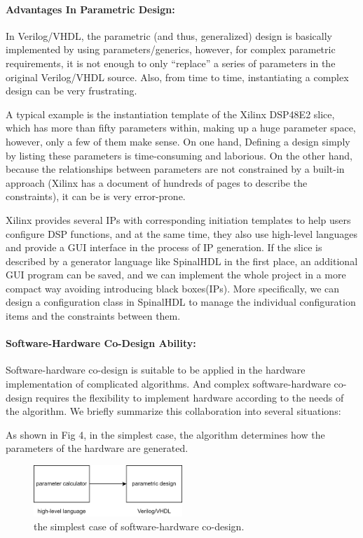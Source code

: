 \documentclass{article}
\begin{document}
\paragraph{\textbf{Advantages In Parametric Design:}}

In Verilog/VHDL, the parametric (and thus, generalized) design is basically implemented by using parameters/generics, however, for complex parametric requirements, it is not enough to only “replace” a series of parameters in the original Verilog/VHDL source. Also, from time to time, instantiating a complex design can be very frustrating.

A typical example is the instantiation template of the Xilinx DSP48E2 slice, which has more than fifty parameters within, making up a huge parameter space, however, only a few of them make sense. On one hand, Defining a design simply by listing these parameters is time-consuming and laborious. On the other hand, because the relationships between parameters are not constrained by a built-in approach (Xilinx has a document of hundreds of pages to describe the constraints), it can be is very error-prone.

Xilinx provides several IPs with corresponding initiation templates to help users configure DSP functions, and at the same time, they also use high-level languages and provide a GUI interface in the process of IP generation. If the slice is described by a generator language like SpinalHDL in the first place, an additional GUI program can be saved, and we can implement the whole project in a more compact way avoiding introducing black boxes(IPs). More specifically, we can design a configuration class in SpinalHDL to manage the individual configuration items and the constraints between them.

\paragraph{\textbf{Software-Hardware Co-Design Ability:}}

Software-hardware co-design is suitable to be applied in the hardware implementation of complicated algorithms. And complex software-hardware co-design requires the flexibility to implement hardware according to the needs of the algorithm. We briefly summarize this collaboration into several situations: 

As shown in Fig 4, in the simplest case, the algorithm determines how the parameters of the hardware are generated.

\begin{figure}[hbt]
\centering
\includegraphics[width=0.5\textwidth]{worst.png}
\caption{\label{fig:worst}the simplest case of software-hardware co-design.}
\end{figure}
\end{document}
